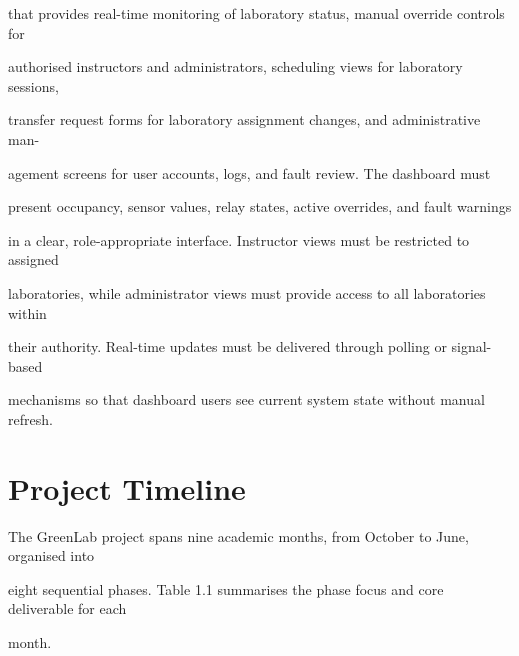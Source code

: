 that provides real-time monitoring of laboratory status, manual override controls for

authorised instructors and administrators, scheduling views for laboratory sessions,

transfer request forms for laboratory assignment changes, and administrative man-

agement screens for user accounts, logs, and fault review. The dashboard must

present occupancy, sensor values, relay states, active overrides, and fault warnings

in a clear, role-appropriate interface. Instructor views must be restricted to assigned

laboratories, while administrator views must provide access to all laboratories within

their authority. Real-time updates must be delivered through polling or signal-based

mechanisms so that dashboard users see current system state without manual refresh.


\section{Project Timeline}
The GreenLab project spans nine academic months, from October to June, organised into

eight sequential phases. Table 1.1 summarises the phase focus and core deliverable for each

month.

